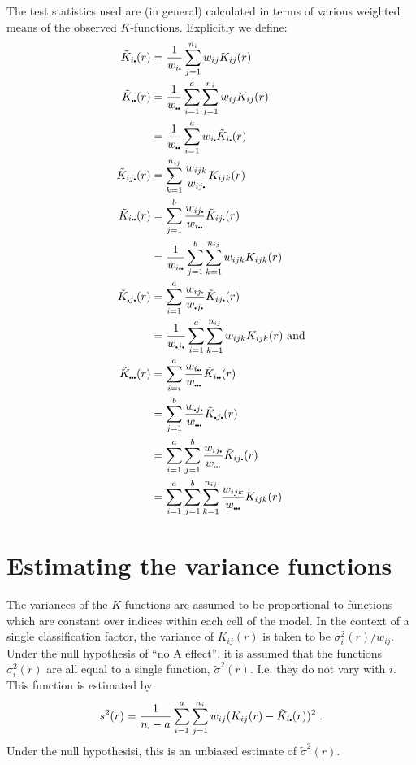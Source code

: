 \documentclass[12pt]{article}
\newcommand{\pt}{\mbox{\scalebox{0.4}{$\bullet$}}}
\begin{document}
The test statistics used are (in general) calculated in terms of
various weighted means of the observed $K$-functions.  Explicitly
we define:
\begin{align*}
\tilde{K}_{i\pt}(r)      &= \frac{1}{w_{i\pt}} \sum_{j=1}^{n_i} w_{ij} K_{ij}(r)\\
\tilde{K}_{\pt\pt}(r)    &= \frac{1}{w_{\pt\pt}} \sum_{i=1}^a
                            \sum_{j=1}^{n_i} w_{ij} K_{ij}(r)\\
                         &= \frac{1}{w_{\pt\pt}} \sum_{i=1}^a w_{i\pt}
                                                \tilde{K}_{i\pt}(r) \\
\tilde{K}_{ij \pt}(r) &= \sum_{k=1}^{n_{ij}}
                            \frac{w_{ijk}}{w_{ij \pt}} K_{ijk}(r) \\
\tilde{K}_{i \pt \pt}(r)
              &= \sum_{j=1}^{b} \frac{w_{ij \pt}}{w_{i \pt \pt}}
                   \tilde{K}_{ij \pt}(r) \\
              &= \frac{1}{w_{i \pt \pt}} \sum_{j=1}^{b}
                          \sum_{k=1}^{n_{ij}} w_{ijk} K_{ijk}(r) \\
\tilde{K}_{\pt j \pt}(r)
              &= \sum_{i=1}^{a} \frac{w_{ij \pt}}{w_{\pt j \pt}}
                   \tilde{K}_{ij \pt}(r) \\
              &= \frac{1}{w_{\pt j \pt}} \sum_{i=1}^{a}
                          \sum_{k=1}^{n_{ij}} w_{ijk} K_{ijk}(r) \mbox{~and} \\
\tilde{K}_{\pt \pt \pt}(r)
              &= \sum_{i=i}^a \frac{w_{i \pt \pt}}{w_{\pt \pt \pt}}
                 \tilde{K}_{i \pt \pt}(r) \\
              &= \sum_{j=1}^b \frac{w_{\pt j \pt}}{w_{\pt \pt \pt}}
                 \tilde{K}_{\pt j \pt}(r) \\
              &= \sum_{i=1}^a \sum_{j=1}^{b} \frac{w_{ij \pt}}{w_{\pt \pt \pt}}
                 \tilde{K}_{ij \pt}(r)\\
              &= \sum_{i=1}^a \sum_{j=1}^{b} \sum_{k=1}^{n_{ij}}
                 \frac{w_{ijk}}{w_{\pt \pt \pt}} K_{ijk}(r)
\end{align*}

\section{Estimating the variance functions}
\label{sec:estvarfns}

The variances of the $K$-functions are assumed to be proportional
to functions which are constant over indices within each cell
of the model.  In the context of a single classification factor,
the variance of $K_{ij}(r)$ is taken to be $\sigma_i^2(r)/w_{ij}$.
Under the null hypothesis of ``no A effect'', it is assumed that
the functions $\sigma_i^2(r)$ are all equal to a single function,
$\tilde{\sigma}^2(r)$.  I.e. they do not vary with $i$.  This function is
estimated by
\[
s^2(r) = \frac{1}{n_{\pt} - a} \sum_{i=1}^a \sum_{j=1}^{n_i}
         w_{ij}(K_{ij}(r) - \tilde{K}_{i\pt}(r))^2 \; .
\]
Under the null hypothesisi, this is an unbiased estimate of $\tilde{\sigma}^2(r)$.
\end{document}
